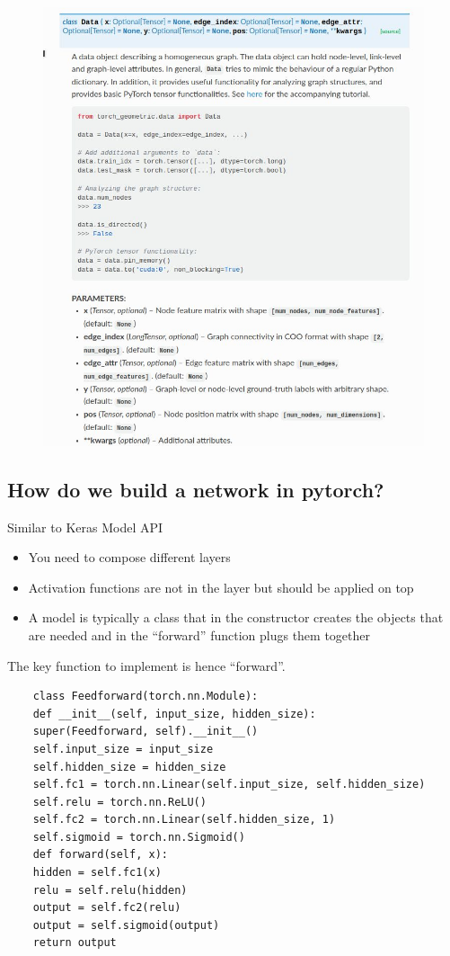\begin{figure}
	\centering
	\includegraphics[width=1\linewidth]{figure_ml/tools.png}
\end{figure}

\subsection{How do we build a network in pytorch?}

Similar to Keras Model API
\begin{itemize}
	\item You need to compose different layers
	\item Activation functions are not in the layer but should be applied on top
	\item A model is typically a class that in the constructor creates the objects that are needed and in the “forward” function plugs them together
\end{itemize}


The key function to implement is hence “forward”.

\begin{verbatim}
	class Feedforward(torch.nn.Module):
	def __init__(self, input_size, hidden_size):
	super(Feedforward, self).__init__()
	self.input_size = input_size
	self.hidden_size = hidden_size
	self.fc1 = torch.nn.Linear(self.input_size, self.hidden_size)
	self.relu = torch.nn.ReLU()
	self.fc2 = torch.nn.Linear(self.hidden_size, 1)
	self.sigmoid = torch.nn.Sigmoid()
	def forward(self, x):
	hidden = self.fc1(x)
	relu = self.relu(hidden)
	output = self.fc2(relu)
	output = self.sigmoid(output)
	return output
\end{verbatim}


